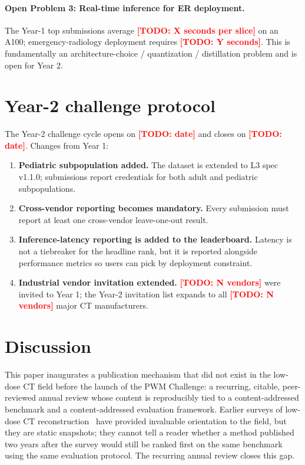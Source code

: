\documentclass[twoside,11pt]{article}
\newcommand{\todo}[1]{\textcolor{red}{\textbf{[TODO: #1]}}}
\begin{document}
\paragraph{Open Problem 3: Real-time inference for ER deployment.} The Year-1 top submissions average \todo{X seconds per slice} on an A100; emergency-radiology deployment requires \todo{Y seconds}. This is fundamentally an architecture-choice / quantization / distillation problem and is open for Year 2.

\section{Year-2 challenge protocol}
\label{sec:year2}

The Year-2 challenge cycle opens on \todo{date} and closes on \todo{date}. Changes from Year 1:

\begin{enumerate}
    \item \textbf{Pediatric subpopulation added.} The dataset is extended to L3 spec v1.1.0; submissions report credentials for both adult and pediatric subpopulations.
    \item \textbf{Cross-vendor reporting becomes mandatory.} Every submission must report at least one cross-vendor leave-one-out result.
    \item \textbf{Inference-latency reporting is added to the leaderboard.} Latency is not a tiebreaker for the headline rank, but it is reported alongside performance metrics so users can pick by deployment constraint.
    \item \textbf{Industrial vendor invitation extended.} \todo{N vendors} were invited to Year 1; the Year-2 invitation list expands to all \todo{N vendors} major CT manufacturers.
\end{enumerate}

\section{Discussion}

This paper inaugurates a publication mechanism that did not exist in the low-dose CT field before the launch of the PWM Challenge: a recurring, citable, peer-reviewed annual review whose content is reproducibly tied to a content-addressed benchmark and a content-addressed evaluation framework. Earlier surveys of low-dose CT reconstruction~\citep{wang2020deeplearningreview} have provided invaluable orientation to the field, but they are static snapshots; they cannot tell a reader whether a method published two years after the survey would still be ranked first on the same benchmark using the same evaluation protocol. The recurring annual review closes this gap.
\end{document}
